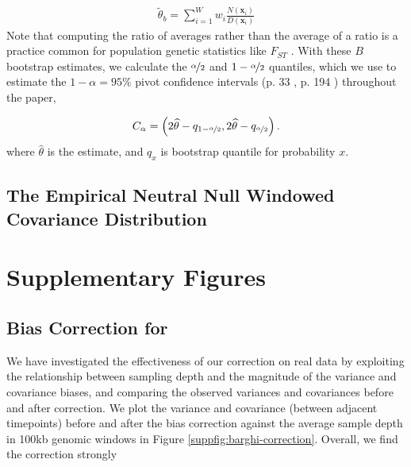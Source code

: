 \documentclass[11pt]{article}
\begin{document}
\begin{align}
  \tilde{\theta}_b = \sum_{i=1}^W w_i \frac{N(\mathbf{x}_i)}{D(\mathbf{x}_i)}
\end{align}
%
Note that computing the ratio of averages rather than the average of a ratio is
a practice common for population genetic statistics like $F_{ST}$
\parencite{Bhatia2013-zy}. With these $B$ bootstrap estimates, we calculate the
$\nicefrac{\alpha}{2}$ and $1-\nicefrac{\alpha}{2}$ quantiles, which we use to
estimate the $1-\alpha = 95\%$ pivot confidence intervals (p. 33
\cite{Wasserman2006-jl}, p. 194 \cite{Davison2013-oy}) throughout the paper,

\begin{align}
  C_\alpha = \left(2 \widehat{\theta} - q_{1-\nicefrac{\alpha}{2}}, 2 \widehat{\theta} - q_{\nicefrac{\alpha}{2}} \right).
\end{align}
%
where $\widehat{\theta}$ is the estimate, and $q_x$ is bootstrap quantile for
probability $x$.

\subsection{The Empirical Neutral Null Windowed Covariance Distribution}
\label{supp:empirical-null}




\section{Supplementary Figures}

\subsection{Bias Correction for \textcite{Barghi2019-qy}}

We have investigated the effectiveness of our correction on real data by
exploiting the relationship between sampling depth and the magnitude of the
variance and covariance biases, and comparing the observed variances and
covariances before and after correction. We plot the variance and covariance
(between adjacent timepoints) before and after the bias correction against the
average sample depth in 100kb genomic windows in Figure
\ref{suppfig:barghi-correction}. Overall, we find the correction strongly
\end{document}
